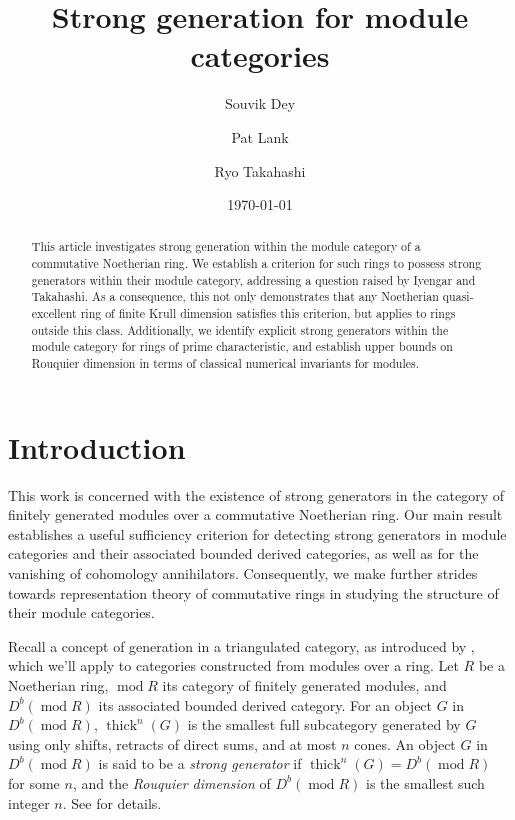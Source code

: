 \documentclass[11pt]{amsart}
\title[Strong generation for module categories]{Strong generation for module categories}
\author[S.~Dey]{Souvik Dey}
\author[P.~Lank]{Pat Lank}
\author[R.~Takahashi]{Ryo Takahashi}
\date{\today}
\newcounter{intro}
\theoremstyle{plain}
\theoremstyle{definition}
\numberwithin{equation}{section}
\numberwithin{theorem}{section}
\begin{document}
\begin{abstract}
    This article investigates strong generation within the module category of a commutative Noetherian ring. We establish a criterion for such rings to possess strong generators within their module category, addressing a question raised by Iyengar and Takahashi. As a consequence, this not only demonstrates that any Noetherian quasi-excellent ring of finite Krull dimension satisfies this criterion, but applies to rings outside this class. Additionally, we identify explicit strong generators within the module category for rings of prime characteristic, and establish upper bounds on Rouquier dimension in terms of classical numerical invariants for modules.
\end{abstract}

\maketitle

\section{Introduction}
\label{sec:intro}

This work is concerned with the existence of strong generators in the category
of finitely generated modules over a commutative Noetherian ring. Our main result establishes a useful sufficiency criterion for detecting strong generators in module categories and their associated bounded derived categories, as well as for the vanishing of cohomology annihilators. Consequently, we make further strides towards representation theory of commutative rings in studying the structure of their module categories.

Recall a concept of generation in a triangulated category, as introduced by \cite{Bondal/VandenBergh:2003}, which we'll apply to categories constructed from modules over a ring. Let $R$ be a Noetherian ring, $\operatorname{mod}R$ its category of finitely generated modules, and $D^b(\operatorname{mod}R)$ its associated bounded derived category. For an object $G$ in $D^b (\operatorname{mod}R)$, $\operatorname{thick}^n (G)$ is the smallest full subcategory generated by $G$ using only shifts, retracts of direct sums, and at most $n$ cones. An object $G$ in $D^b(\operatorname{mod}R)$ is said to be a \textit{strong generator} if $\operatorname{thick}^n (G) = D^b(\operatorname{mod}R)$ for some $n$, and the \textit{Rouquier dimension} of $D^b( \operatorname{mod}R)$ is the smallest such integer $n$. See  for details.
\end{document}
